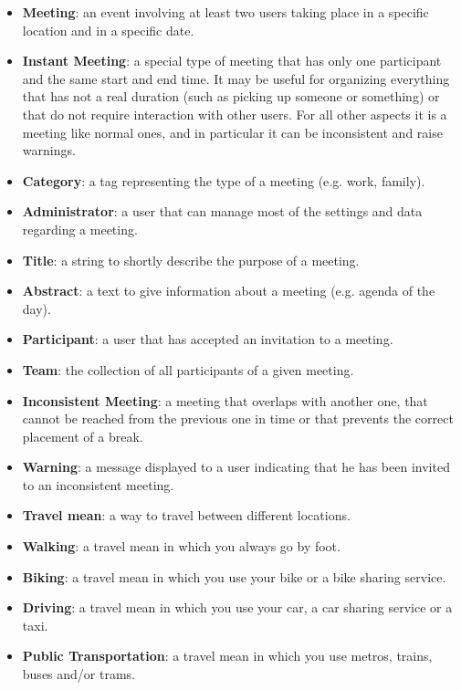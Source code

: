 \begin{itemize}
\item \textbf{Meeting}: an event involving at least two users taking place in a specific location and in a specific date.
\item \textbf{Instant Meeting}: a special type of meeting that has only one participant and the same start and end time. It may be useful for organizing everything that has not a real duration (such as picking up someone or something) or that do not require interaction with other users. For all other aspects it is a meeting like normal ones, and in particular it can be inconsistent and raise warnings.
\item \textbf{Category}: a tag representing the type of a meeting (e.g. work, family).
\item \textbf{Administrator}: a user that can manage most of the settings and data regarding a meeting.
\item \textbf{Title}: a string to shortly describe the purpose of a meeting.
\item \textbf{Abstract}: a text to give information about a meeting (e.g. agenda of the day).
\item \textbf{Participant}: a user that has accepted an invitation to a meeting.
\item \textbf{Team}: the collection of all participants of a given meeting.

\item \textbf{Inconsistent Meeting}: a meeting that overlaps with another one, that cannot be reached from the previous one in time or that prevents the correct placement of a break.
\item \textbf{Warning}: a message displayed to a user indicating that he has been invited to an inconsistent meeting.

\item \textbf{Travel mean}: a way to travel between different locations.
\item \textbf{Walking}: a travel mean in which you always go by foot.
\item \textbf{Biking}: a travel mean in which you use your bike or a bike sharing service.
\item \textbf{Driving}: a travel mean in which you use your car, a car sharing service or a taxi.
\item \textbf{Public Transportation}: a travel mean in which you use metros, trains, buses and/or trams.


\end{itemize}
